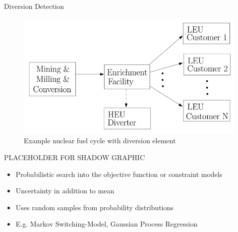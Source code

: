 \documentclass[final]{beamer}
\newlength{\onecolwid}
\newlength{\threecolwid}
\begin{document}
\begin{frame}[t]
\begin{columns}[t,totalwidth=\threecolwid]

\begin{column}{\onecolwid} %


\begin{block}{Diversion Detection}\end{block}

	\begin{figure}
		\includegraphics[width=0.9\linewidth]{Yilmaz_Graphic}
		\caption{Example nuclear fuel cycle with diversion element \cite{Yilmaz_2016}}
	\end{figure}

        \begin{alertblock}{PLACEHOLDER FOR SHADOW GRAPHIC}
	\begin{itemize}
		\item {\large Probabilistic search into the objective function or constraint models}
		\item {\large Uncertainty in addition to mean}
		\item {\large Uses random samples from probability distributions}
		\item {\large E.g. Markov Switching-Model, Gaussian Process Regression}
	\end{itemize}
        \end{alertblock}
    


\end{column}
\end{columns}
\end{frame}
\end{document}
